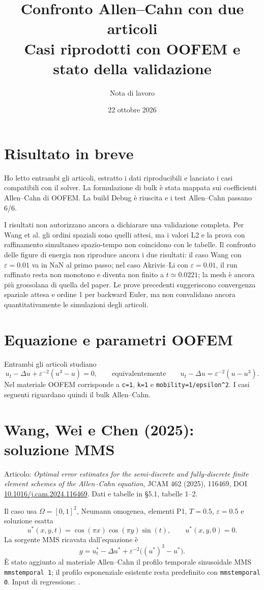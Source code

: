 \documentclass[10pt,a4paper]{article}
\title{Confronto Allen--Cahn con due articoli\\[0.2em]\large Casi riprodotti con OOFEM e stato della validazione}
\author{Nota di lavoro}
\date{22 ottobre 2026}
\begin{document}
\maketitle

\section*{Risultato in breve}
Ho letto entrambi gli articoli, estratto i dati riproducibili e lanciato i casi compatibili con il solver. La formulazione di bulk è stata mappata sui coefficienti Allen--Cahn di OOFEM. La build Debug è riuscita e i test Allen--Cahn passano 6/6.

I risultati non autorizzano ancora a dichiarare una validazione completa. Per Wang et al. gli ordini spaziali sono quelli attesi, ma i valori L2 e la prova con raffinamento simultaneo spazio-tempo non coincidono con le tabelle. Il confronto delle figure di energia non riproduce ancora i due risultati: il caso Wang con \(\varepsilon=0.01\) va in NaN al primo passo; nel caso Akrivis--Li con \(\varepsilon=0.01\), il run raffinato resta non monotono e diventa non finito a \(t\simeq0.0221\); la mesh è ancora più grossolana di quella del paper. Le prove precedenti suggeriscono convergenza spaziale attesa e ordine 1 per backward Euler, ma non convalidano ancora quantitativamente le simulazioni degli articoli.

\section{Equazione e parametri OOFEM}
Entrambi gli articoli studiano
\[
 u_t-\Delta u+\varepsilon^{-2}(u^3-u)=0,
 \qquad\text{equivalentemente}\qquad
 u_t-\Delta u=\varepsilon^{-2}(u-u^3).
\]
Nel materiale OOFEM corrisponde a \texttt{c=1}, \texttt{k=1} e \texttt{mobility=1/epsilon\textasciicircum 2}. I casi seguenti riguardano quindi il bulk Allen--Cahn.

\section{Wang, Wei e Chen (2025): soluzione MMS}
Articolo: \emph{Optimal error estimates for the semi-discrete and fully-discrete finite element schemes of the Allen--Cahn equation}, JCAM 462 (2025), 116469, DOI \href{https://doi.org/10.1016/j.cam.2024.116469}{10.1016/j.cam.2024.116469}. Dati e tabelle in §5.1, tabelle 1--2.

Il caso usa \(\Omega=[0,1]^2\), Neumann omogenea, elementi P1, \(T=0.5\), \(\varepsilon=0.5\) e soluzione esatta
\[
 u^*(x,y,t)=\cos(\pi x)\cos(\pi y)\sin(t),\qquad u^*(x,y,0)=0.
\]
La sorgente MMS ricavata dall'equazione è
\[
 g=u_t^*-\Delta u^*+\varepsilon^{-2}\big((u^*)^3-u^*\big).
\]
È stato aggiunto al materiale Allen--Cahn il profilo temporale sinusoidale MMS \texttt{mmstemporal 1}; il profilo esponenziale esistente resta predefinito con \texttt{mmstemporal 0}. Input di regressione: .
\end{document}
